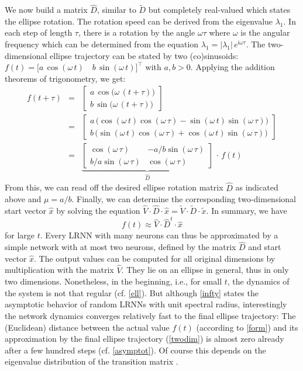 \documentclass[twoside,11pt]{article}
\theoremstyle{definition}
\begin{document}
We now build a matrix $\hat{D}$, similar to $\tilde{D}$ but completely
real-valued which states the ellipse rotation. The rotation
speed can be derived from the eigenvalue $\lambda_1$. In each step of length
$\tau$, there is a rotation by the angle $\omega\tau$ where $\omega$ is the
angular frequency which can be determined from the equation $\lambda_1 =
|\lambda_1|\,e^{\mathfrak{i}\omega\tau}$. The two-dimensional ellipse trajectory can be stated by
two (co)sinusoids: $f(t) = \big[ a\,\cos(\omega\,t) \quad b\,\sin(\omega\,t)
\big]^\top$ with $a,b > 0$. Applying the addition theorems of trigonometry, we
get:
\begin{eqnarray*}
	f(t+\tau) & = &
	\left[ \begin{array}{c} a\,\cos\!\big(\omega\,(t+\tau)\big) \\ b\,\sin\!\big(\omega\,(t+\tau)\big) \end{array} \right]\\ & = &
	\left[ \begin{array}{c}
		a\,\big(\!\cos(\omega\,t) \cos(\omega\,\tau) - \sin(\omega\,t) \sin(\omega\,\tau) \big) \\
		b\,\big(\!\sin(\omega\,t) \cos(\omega\,\tau) + \cos(\omega\,t) \sin(\omega\,\tau) \big)
	\end{array} \right] \\ & = &
	\underbrace{\left[ \begin{array}{cc}
		\cos(\omega\,\tau) & -a/b \sin(\omega\,\tau) \\
		b/a \sin(\omega\,\tau) & \cos(\omega\,\tau)
	\end{array} \right]}_{\displaystyle\hat{D}}\,\cdot\,f(t)
\end{eqnarray*}
From this, we can read off the desired ellipse rotation matrix $\hat{D}$ as
indicated above and $\mu = a/b$. Finally, we can determine the corresponding
two-dimensional start vector $\hat{x}$ by solving the equation $\hat{V} \cdot
\hat{D} \cdot \hat{x} = \tilde{V} \cdot \tilde{D} \cdot \tilde{x}$.
In summary, we have
\begin{equation}\label{twodim}
	f(t) \approx \hat{V} \cdot \hat{D}^t \cdot \hat{x}
\end{equation}
for large $t$. Every LRNN with many neurons can thus be
approximated by a simple network with at most two neurons, defined by the matrix
$\hat{D}$ and start vector $\hat{x}$. The output values can be computed for
all original dimensions by multiplication with the matrix $\hat{V}$. They lie on
an ellipse in general, thus in only two dimensions. Nonetheless, in the beginning, i.e., for small $t$, the
dynamics of the system is not that regular (cf. \cref{ell}). But although
\cref{infty} states the asymptotic behavior of random LRNNs with unit spectral
radius, interestingly the network dynamics converges relatively fast to the
final ellipse trajectory: The (Euclidean) distance between the actual value
$f(t)$ (according to \cref{form}) and its approximation by the final ellipse
trajectory (\cref{twodim}) is almost zero already after a few hundred
steps (cf. \cref{asymptot}). Of course this depends on
the eigenvalue distribution of the transition matrix \citep{TV10}.
\end{document}
